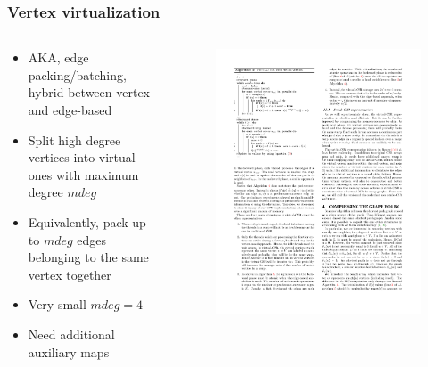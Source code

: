 \begin{frame}
  \frametitle{Vertex virtualization}

  \begin{columns}[onlytextwidth]
    \begin{column}{0.5\textwidth}
      \begin{itemize}
        \item AKA, edge packing/batching, \\ hybrid between vertex- and edge-based
        \item Split high degree vertices into virtual ones with maximum degree $mdeg$
        \item Equivalently, pack up to $mdeg$ edges belonging to the same vertex together
        \item Very small $mdeg = 4$
        \item Need additional auxiliary maps
      \end{itemize}
    \end{column}

    \begin{column}{0.5\textwidth}
      \begin{figure}[t]
        \centering
        \includegraphics[width=\textwidth, height=0.8\textheight, keepaspectratio]{imgs/gpu-algo-hybrid}
      \end{figure}
    \end{column}
  \end{columns}

\end{frame}


